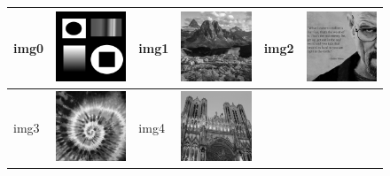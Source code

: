 \documentclass{article}
\begin{document}
\begin{figure}
\begin{center}
\begin{tabular}[t]{|ll|ll|ll|}
\hline
img0 & \includegraphics[width=4cm]{../imgs/input/imgs_gray/img00.png} &
img1 & \includegraphics[width=4cm]{../imgs/input/imgs_gray/img01.png} &
img2 & \includegraphics[width=4cm]{../imgs/input/imgs_gray/img02.png} \\
\hline
img3 & \includegraphics[width=4cm]{../imgs/input/imgs_gray/img03.png} &
img4 & \includegraphics[width=4cm]{../imgs/input/imgs_gray/img04.png} &

\end{tabular}
\end{center}
\end{figure}
\end{document}
